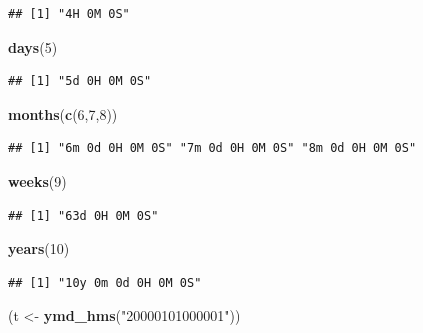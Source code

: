 \documentclass[]{book}
\newenvironment{Shaded}{\begin{snugshade}}{\end{snugshade}}
\newcommand{\DecValTok}[1]{\textcolor[rgb]{0.00,0.00,0.81}{#1}}
\newcommand{\KeywordTok}[1]{\textcolor[rgb]{0.13,0.29,0.53}{\textbf{#1}}}
\newcommand{\NormalTok}[1]{#1}
\newcommand{\StringTok}[1]{\textcolor[rgb]{0.31,0.60,0.02}{#1}}
\theoremstyle{definition}
\theoremstyle{definition}
\theoremstyle{definition}
\theoremstyle{remark}
\begin{document}
\begin{verbatim}
## [1] "4H 0M 0S"
\end{verbatim}

\begin{Shaded}
\begin{Highlighting}[]
\KeywordTok{days}\NormalTok{(}\DecValTok{5}\NormalTok{)}
\end{Highlighting}
\end{Shaded}

\begin{verbatim}
## [1] "5d 0H 0M 0S"
\end{verbatim}

\begin{Shaded}
\begin{Highlighting}[]
\KeywordTok{months}\NormalTok{(}\KeywordTok{c}\NormalTok{(}\DecValTok{6}\NormalTok{,}\DecValTok{7}\NormalTok{,}\DecValTok{8}\NormalTok{))}
\end{Highlighting}
\end{Shaded}

\begin{verbatim}
## [1] "6m 0d 0H 0M 0S" "7m 0d 0H 0M 0S" "8m 0d 0H 0M 0S"
\end{verbatim}

\begin{Shaded}
\begin{Highlighting}[]
\KeywordTok{weeks}\NormalTok{(}\DecValTok{9}\NormalTok{)}
\end{Highlighting}
\end{Shaded}

\begin{verbatim}
## [1] "63d 0H 0M 0S"
\end{verbatim}

\begin{Shaded}
\begin{Highlighting}[]
\KeywordTok{years}\NormalTok{(}\DecValTok{10}\NormalTok{)}
\end{Highlighting}
\end{Shaded}

\begin{verbatim}
## [1] "10y 0m 0d 0H 0M 0S"
\end{verbatim}

\begin{Shaded}
\begin{Highlighting}[]
\NormalTok{(t <-}\StringTok{ }\KeywordTok{ymd_hms}\NormalTok{(}\StringTok{"20000101000001"}\NormalTok{))}
\end{Highlighting}
\end{Shaded}
\end{document}
